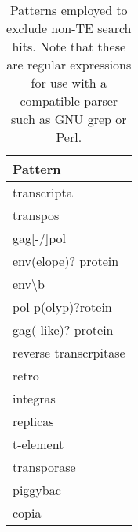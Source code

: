 \begin{table}[]
\caption[Word patterns to exclude non-TE search hits]{{Patterns employed to
exclude non-TE search hits. Note that these are regular expressions for use
with a compatible parser such as GNU grep or Perl.\label{tab:patterns}}}
\centering
\begin{tabular}{@{}l@{}}
\toprule
Pattern               \\ \midrule
transcripta           \\
transpos              \\
gag{[}-/{]}pol        \\
env(elope)? protein   \\
env\textbackslash{}b  \\
pol p(olyp)?rotein    \\
gag(-like)? protein   \\
reverse transcrpitase \\
retro                 \\
integras              \\
replicas              \\
t-element             \\
transporase           \\
piggybac              \\
copia                 \\ \bottomrule
\end{tabular}
\end{table}
